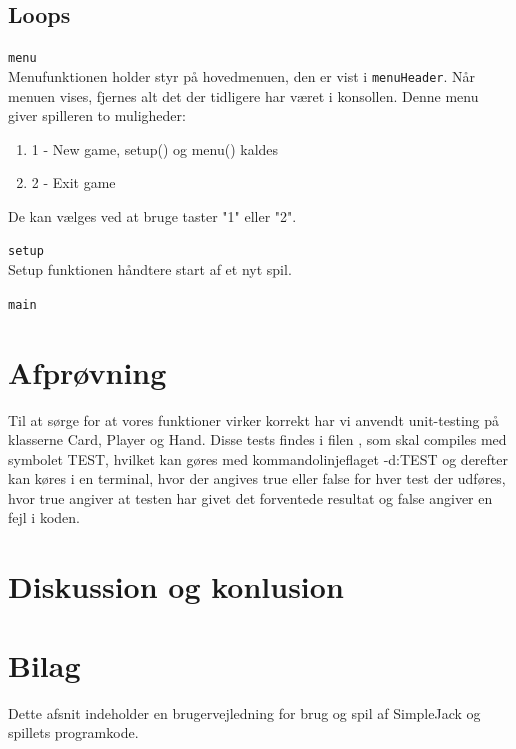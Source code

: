 \documentclass[a4paper]{article}
\begin{document}
    \subsection{Loops} \label{ssec:loops}
    \begin{description}
      \item{\texttt{menu}}~\\
      Menufunktionen holder styr på hovedmenuen, den er vist i \lstinline$menuHeader$.
      Når menuen vises, fjernes alt det der tidligere har været i konsollen.
      Denne menu giver spilleren to muligheder:
      \begin{enumerate}
        \item 1 - New game, setup() og menu() kaldes
        \item 2 - Exit game
      \end{enumerate}
      De kan vælges ved at bruge taster "1" eller "2".
      
      \item{\texttt{setup}}~\\
      Setup funktionen håndtere start af et nyt spil.
      
      \item{\texttt{main}}~\\
    \end{description}
      
      
  \section{Afprøvning} \label{sec:unitTest}
    Til at sørge for at vores funktioner virker korrekt har vi
    anvendt unit-testing på klasserne Card, Player og Hand.
    Disse tests findes i filen , som skal
    compiles med symbolet TEST, hvilket kan gøres med
    kommandolinjeflaget -d:TEST og derefter kan køres i en
    terminal, hvor der angives true eller false for hver test
    der udføres, hvor true angiver at testen har givet det
    forventede resultat og false angiver en fejl i koden.

	\section{Diskussion og konlusion} \label{sec:conclusion}
  
    \newpage
    \section{Bilag}
      Dette afsnit indeholder en brugervejledning for brug og spil af SimpleJack og spillets programkode.
\end{document}
